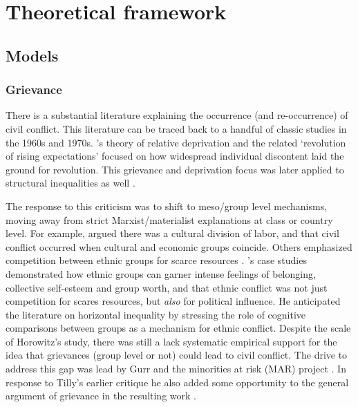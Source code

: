 \section{Theoretical framework}
\label{Theoretical framework}

\subsection{Models} \label{Models}

\subsubsection{Grievance} \label{Grievance}

There is a substantial literature explaining the occurrence (and re-occurrence)
of civil conflict. This literature can be traced back to a handful of classic
studies in the 1960s and 1970s. \citet{GurrTedRobert1970Wmr}'s theory of
relative deprivation and the related `revolution of rising expectations'
\citep{Davies_1962} focused on how widespread individual discontent laid the
ground for revolution. This grievance and deprivation focus was later applied to
structural inequalities as well \citep{Muller_1985, Muller_1987,
ScottJamesC1977TMEo}. 

The response to this criticism was to shift to meso/group level mechanisms,
moving away from strict Marxist/materialist explanations at class or country
level. For example, \citet{Hechter_1978} argued there was a cultural division of
labor, and that civil conflict occurred when cultural and economic groups
coincide. Others emphasized competition between ethnic groups for scarce
resources \citep{barth1969}. \citet{Horowitz1985}'s case studies demonstrated
how ethnic groups can garner intense feelings of belonging, collective
self-esteem and group worth, and that ethnic conflict was not just competition
for scares resources, but \textit{also} for political influence. He anticipated
the literature on horizontal inequality by stressing the role of cognitive
comparisons between groups as a mechanism for ethnic conflict. Despite the scale
of Horowitz's study, there was still a lack systematic empirical support for the
idea that grievances (group level or not) could lead to civil conflict. The
drive to address this gap was lead by Gurr and the minorities at risk (MAR)
project \citet{GurrTedRobert1993Mar:}. In response to Tilly's earlier
critique he also added some opportunity to the general argument of grievance in
the resulting work \citep{Gurr_1993}. 

